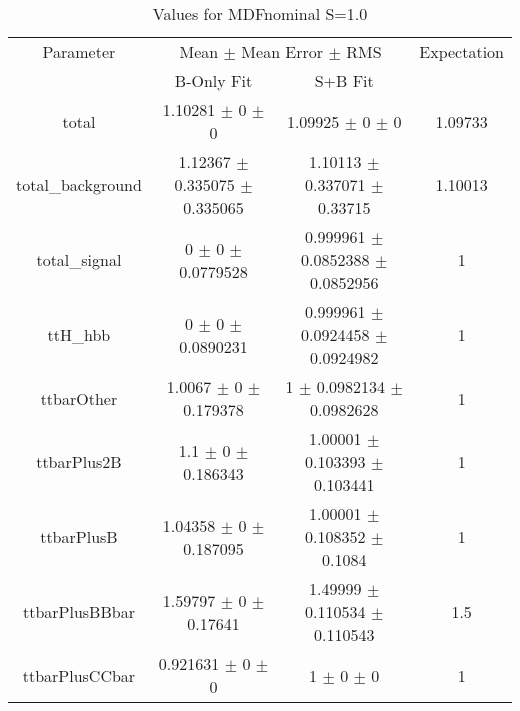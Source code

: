 \begin{table}
\centering
\caption{Values for MDFnominal S=1.0}
\begin{tabular}{cccc}
\toprule
Parameter & \multicolumn{2}{c}{Mean $\pm$ Mean Error $\pm$ RMS} & Expectation\\
 & B-Only Fit & S+B Fit & \\
\midrule
total & \num{1.10281} $\pm$ \num{0} $\pm$ \num{0} & \num{1.09925} $\pm$ \num{0} $\pm$ \num{0} & \num{1.09733}\\
total\_background & \num{1.12367} $\pm$ \num{0.335075} $\pm$ \num{0.335065} & \num{1.10113} $\pm$ \num{0.337071} $\pm$ \num{0.33715} & \num{1.10013}\\
total\_signal & \num{0} $\pm$ \num{0} $\pm$ \num{0.0779528} & \num{0.999961} $\pm$ \num{0.0852388} $\pm$ \num{0.0852956} & \num{1}\\
ttH\_hbb & \num{0} $\pm$ \num{0} $\pm$ \num{0.0890231} & \num{0.999961} $\pm$ \num{0.0924458} $\pm$ \num{0.0924982} & \num{1}\\
ttbarOther & \num{1.0067} $\pm$ \num{0} $\pm$ \num{0.179378} & \num{1} $\pm$ \num{0.0982134} $\pm$ \num{0.0982628} & \num{1}\\
ttbarPlus2B & \num{1.1} $\pm$ \num{0} $\pm$ \num{0.186343} & \num{1.00001} $\pm$ \num{0.103393} $\pm$ \num{0.103441} & \num{1}\\
ttbarPlusB & \num{1.04358} $\pm$ \num{0} $\pm$ \num{0.187095} & \num{1.00001} $\pm$ \num{0.108352} $\pm$ \num{0.1084} & \num{1}\\
ttbarPlusBBbar & \num{1.59797} $\pm$ \num{0} $\pm$ \num{0.17641} & \num{1.49999} $\pm$ \num{0.110534} $\pm$ \num{0.110543} & \num{1.5}\\
ttbarPlusCCbar & \num{0.921631} $\pm$ \num{0} $\pm$ \num{0} & \num{1} $\pm$ \num{0} $\pm$ \num{0} & \num{1}\\
\bottomrule
\end{tabular}
\end{table}